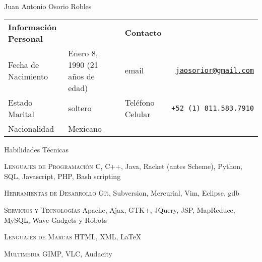 \documentclass[spanish,10pt,letterpaper]{article}
\begin{document}
\centering
\begin{cv}{Juan Antonio Osorio Robles}

	
	\begin{table}[h]
		\begin{tabular}{@{} l l p{0.5cm} l r}
			{\bf Información Personal}	&	&	&	{\bf Contacto}	&	\\
			Fecha de Nacimiento			&	Enero 8, 1990 (21 años de edad)	&	&
			email	&	\href{mailto:jaosorior@gmail.com}	{\tt jaosorior@gmail.com}	\\
			Estado Marital		&	soltero		&	&
			Teléfono Celular				&	{\tt +52~(1)~811.583.7910}	\\
			Nacionalidad			&	Mexicano		&	&
		\end{tabular}
	\end{table}
	
	\begin{cvlist}{Habilidades Técnicas}
			\item [\textsc{Lenguajes de Programación}]
				C, C++, Java, Racket (antes Scheme), Python, SQL, Javascript, PHP, Bash scripting
			\item [\textsc{Herramientas de Desarrollo}]
				Git, Subversion, Mercurial, Vim, Eclipse, gdb
			\item [\textsc {Servicios y Tecnologías}]
				Apache, Ajax, GTK+, JQuery, JSP, MapReduce, MySQL, Wave Gadgets y Robots
			\item [\textsc {Lenguajes de Marcas}]
				HTML, XML,
				\LaTeX
		\item [\textsc {Multimedia}]
				GIMP, VLC, Audacity
	\end{cvlist}


\end{cv}
\end{document}
